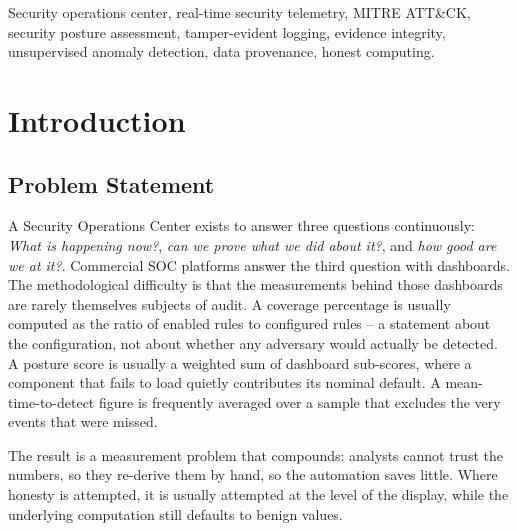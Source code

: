 \documentclass[conference]{IEEEtran}
\begin{document}
\begin{abstract}
Evaluation on an 8{,}658-event live corpus shows an ingest-to-console p99 of
10.58~ms (100\% of deliveries under the 2\,s operational target), a
tamper-evident audit ledger of 2{,}847 records verifying intact, and an
alert-compression ratio of 101.7 detection firings per analyst-facing alert.
The evaluation process itself surfaced two silent pipeline defects -- a
NameError that silently dropped an entire malware detection class and a
column allow-list that prevented incident timelines from accumulating -- which
we describe as evidence for the paper's central claim: without a
data-quality signal wired to a live counter, correctness failures of exactly
this kind remain invisible to operators.
\end{abstract}

\begin{IEEEkeywords}
Security operations center, real-time security telemetry, MITRE ATT\&CK,
security posture assessment, tamper-evident logging, evidence integrity,
unsupervised anomaly detection, data provenance, honest computing.
\end{IEEEkeywords}

\section{Introduction}

\subsection{Problem Statement}

A Security Operations Center exists to answer three questions continuously:
\emph{What is happening now?}, \emph{can we prove what we did about it?}, and
\emph{how good are we at it?}. Commercial SOC platforms answer the third
question with dashboards. The methodological difficulty is that the
measurements behind those dashboards are rarely themselves subjects of
audit. A coverage percentage is usually computed as the ratio of enabled
rules to configured rules -- a statement about the configuration, not about
whether any adversary would actually be detected. A posture score is usually
a weighted sum of dashboard sub-scores, where a component that fails to load
quietly contributes its nominal default. A mean-time-to-detect figure is
frequently averaged over a sample that excludes the very events that were
missed.

The result is a measurement problem that compounds: analysts cannot trust
the numbers, so they re-derive them by hand, so the automation saves little.
Where honesty is attempted, it is usually attempted at the level of the
display, while the underlying computation still defaults to benign values.
\end{document}
